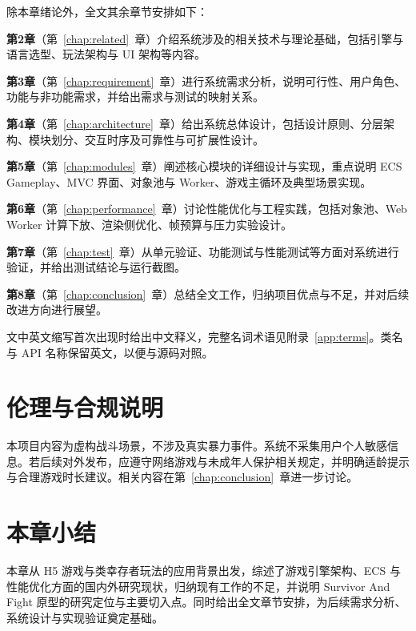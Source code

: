 除本章绪论外，全文其余章节安排如下：

\textbf{第2章}（第~\ref{chap:related}~章）介绍系统涉及的相关技术与理论基础，包括引擎与语言选型、玩法架构与 UI 架构等内容。

\textbf{第3章}（第~\ref{chap:requirement}~章）进行系统需求分析，说明可行性、用户角色、功能与非功能需求，并给出需求与测试的映射关系。

\textbf{第4章}（第~\ref{chap:architecture}~章）给出系统总体设计，包括设计原则、分层架构、模块划分、交互时序及可靠性与可扩展性设计。

\textbf{第5章}（第~\ref{chap:modules}~章）阐述核心模块的详细设计与实现，重点说明 ECS Gameplay、MVC 界面、对象池与 Worker、游戏主循环及典型场景实现。

\textbf{第6章}（第~\ref{chap:performance}~章）讨论性能优化与工程实践，包括对象池、Web Worker 计算下放、渲染侧优化、帧预算与压力实验设计。

\textbf{第7章}（第~\ref{chap:test}~章）从单元验证、功能测试与性能测试等方面对系统进行验证，并给出测试结论与运行截图。

\textbf{第8章}（第~\ref{chap:conclusion}~章）总结全文工作，归纳项目优点与不足，并对后续改进方向进行展望。

文中英文缩写首次出现时给出中文释义，完整名词术语见附录~\ref{app:terms}。类名与 API 名称保留英文，以便与源码对照。

\section{伦理与合规说明}

本项目内容为虚构战斗场景，不涉及真实暴力事件。系统不采集用户个人敏感信息。若后续对外发布，应遵守网络游戏与未成年人保护相关规定，并明确适龄提示与合理游戏时长建议。相关内容在第~\ref{chap:conclusion}~章进一步讨论。

\section{本章小结}

本章从 H5 游戏与类幸存者玩法的应用背景出发，综述了游戏引擎架构、ECS 与性能优化方面的国内外研究现状，归纳现有工作的不足，并说明 Survivor And Fight 原型的研究定位与主要切入点。同时给出全文章节安排，为后续需求分析、系统设计与实现验证奠定基础。
